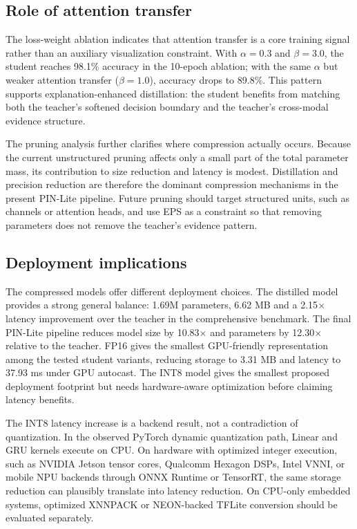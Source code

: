 \documentclass[pdflatex,sn-basic,Numbered]{sn-jnl}
\begin{document}
\subsection{Role of attention transfer}\label{subsec:attention-transfer}

The loss-weight ablation indicates that attention transfer is a core training signal rather than an auxiliary visualization constraint. With $\alpha=0.3$ and $\beta=3.0$, the student reaches 98.1\% accuracy in the 10-epoch ablation; with the same $\alpha$ but weaker attention transfer ($\beta=1.0$), accuracy drops to 89.8\%. This pattern supports explanation-enhanced distillation: the student benefits from matching both the teacher's softened decision boundary and the teacher's cross-modal evidence structure.

The pruning analysis further clarifies where compression actually occurs. Because the current unstructured pruning affects only a small part of the total parameter mass, its contribution to size reduction and latency is modest. Distillation and precision reduction are therefore the dominant compression mechanisms in the present PIN-Lite pipeline. Future pruning should target structured units, such as channels or attention heads, and use EPS as a constraint so that removing parameters does not remove the teacher's evidence pattern.

\subsection{Deployment implications}\label{subsec:deployment}

The compressed models offer different deployment choices. The distilled model provides a strong general balance: 1.69M parameters, 6.62 MB and a 2.15$\times$ latency improvement over the teacher in the comprehensive benchmark. The final PIN-Lite pipeline reduces model size by 10.83$\times$ and parameters by 12.30$\times$ relative to the teacher. FP16 gives the smallest GPU-friendly representation among the tested student variants, reducing storage to 3.31 MB and latency to 37.93 ms under GPU autocast. The INT8 model gives the smallest proposed deployment footprint but needs hardware-aware optimization before claiming latency benefits.

The INT8 latency increase is a backend result, not a contradiction of quantization. In the observed PyTorch dynamic quantization path, Linear and GRU kernels execute on CPU. On hardware with optimized integer execution, such as NVIDIA Jetson tensor cores, Qualcomm Hexagon DSPs, Intel VNNI, or mobile NPU backends through ONNX Runtime or TensorRT, the same storage reduction can plausibly translate into latency reduction. On CPU-only embedded systems, optimized XNNPACK or NEON-backed TFLite conversion should be evaluated separately.
\end{document}
